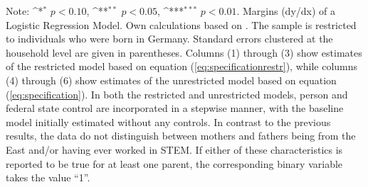 \documentclass[a4paper, oneside, hyperfootnotes = false]{article}
\def\sym#1{\ifmmode^{#1}\else\(^{#1}\)\fi}
\begin{document}
{\begin{landscape}
\begin{table}[ht]
\begin{center}
			\vspace{2mm}
			
			\parbox{15cm}{
				\linespread{1}\footnotesize Note: \sym{*} \(p<0.10\), \sym{**} \(p<0.05\), \sym{***} \(p<0.01\). Margins (dy/dx) of a Logistic Regression Model. Own calculations based on \cite{SOEP2023}. The sample is restricted to individuals who were born in Germany. Standard errors clustered at the household level are given in parentheses. Columns (1) through (3) show estimates of the restricted model based on equation (\ref{eq:specificationrestr}), while columns (4) through (6) show estimates of the unrestricted model based on equation (\ref{eq:specification}). In both the restricted and unrestricted models, person and federal state control are incorporated in a stepwise manner, with the baseline model initially estimated without any controls. In contrast to the previous results, the data do not distinguish between mothers and fathers being from the East and/or having ever worked in STEM. If either of these characteristics is reported to be true for at least one parent, the corresponding binary variable takes the value ``1''.}
			
		\end{center}
	\end{table}
\end{landscape}

}
\end{document}

